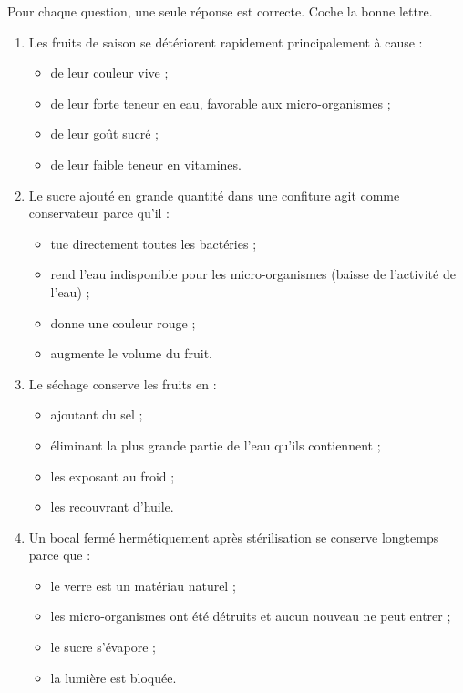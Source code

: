 \documentclass[11pt]{article}
\begin{document}
\begin{exercice}
Pour chaque question, une seule réponse est correcte. Coche la bonne lettre.
\begin{enumerate}
\item Les fruits de saison se détériorent rapidement principalement à cause :
\begin{itemize}
\item[\textbf{a)}] de leur couleur vive ;
\item[\textbf{b)}] de leur forte teneur en eau, favorable aux micro-organismes ;
\item[\textbf{c)}] de leur goût sucré ;
\item[\textbf{d)}] de leur faible teneur en vitamines.
\end{itemize}
\item Le sucre ajouté en grande quantité dans une confiture agit comme conservateur parce qu'il :
\begin{itemize}
\item[\textbf{a)}] tue directement toutes les bactéries ;
\item[\textbf{b)}] rend l'eau indisponible pour les micro-organismes (baisse de l'activité de l'eau) ;
\item[\textbf{c)}] donne une couleur rouge ;
\item[\textbf{d)}] augmente le volume du fruit.
\end{itemize}
\item Le séchage conserve les fruits en :
\begin{itemize}
\item[\textbf{a)}] ajoutant du sel ;
\item[\textbf{b)}] éliminant la plus grande partie de l'eau qu'ils contiennent ;
\item[\textbf{c)}] les exposant au froid ;
\item[\textbf{d)}] les recouvrant d'huile.
\end{itemize}
\item Un bocal fermé hermétiquement après stérilisation se conserve longtemps parce que :
\begin{itemize}
\item[\textbf{a)}] le verre est un matériau naturel ;
\item[\textbf{b)}] les micro-organismes ont été détruits et aucun nouveau ne peut entrer ;
\item[\textbf{c)}] le sucre s'évapore ;
\item[\textbf{d)}] la lumière est bloquée.
\end{itemize}
\end{enumerate}
\end{exercice}
\end{document}
